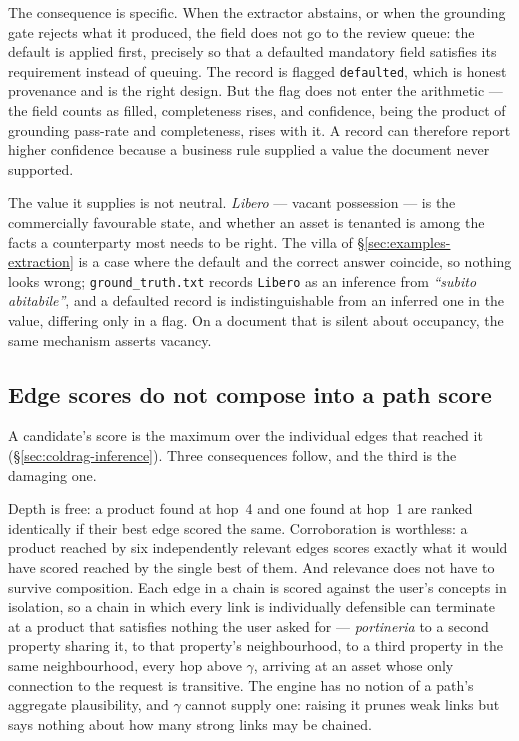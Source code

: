 The consequence is specific. When the extractor abstains, or when the grounding gate rejects what it produced, the field does not go to the review queue: the default is applied first, precisely so that a defaulted mandatory field satisfies its requirement instead of queuing. The record is flagged \texttt{defaulted}, which is honest provenance and is the right design. But the flag does not enter the arithmetic --- the field counts as filled, completeness rises, and confidence, being the product of grounding pass-rate and completeness, rises with it. A record can therefore report higher confidence because a business rule supplied a value the document never supported.

The value it supplies is not neutral. \emph{Libero} --- vacant possession --- is the commercially favourable state, and whether an asset is tenanted is among the facts a counterparty most needs to be right. The villa of \S\ref{sec:examples-extraction} is a case where the default and the correct answer coincide, so nothing looks wrong; \texttt{ground\_truth.txt} records \texttt{Libero} as an inference from \emph{``subito abitabile''}, and a defaulted record is indistinguishable from an inferred one in the value, differing only in a flag. On a document that is silent about occupancy, the same mechanism asserts vacancy.

\subsection{Edge scores do not compose into a path score}

A candidate's score is the maximum over the individual edges that reached it (\S\ref{sec:coldrag-inference}). Three consequences follow, and the third is the damaging one.

Depth is free: a product found at hop~4 and one found at hop~1 are ranked identically if their best edge scored the same. Corroboration is worthless: a product reached by six independently relevant edges scores exactly what it would have scored reached by the single best of them. And relevance does not have to survive composition. Each edge in a chain is scored against the user's concepts in isolation, so a chain in which every link is individually defensible can terminate at a product that satisfies nothing the user asked for --- \emph{portineria} to a second property sharing it, to that property's neighbourhood, to a third property in the same neighbourhood, every hop above $\gamma$, arriving at an asset whose only connection to the request is transitive. The engine has no notion of a path's aggregate plausibility, and $\gamma$ cannot supply one: raising it prunes weak links but says nothing about how many strong links may be chained.


